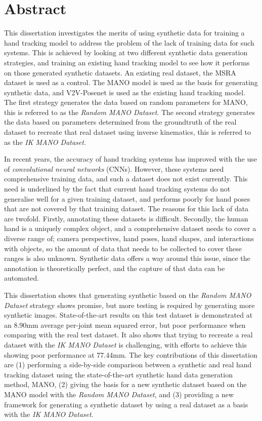 \chapter{Abstract}

This dissertation investigates the merits of using synthetic data for training a hand tracking model to address the problem of the lack of training data for such systems. This is achieved by looking at two different synthetic data generation strategies, and training an existing hand tracking model to see how it performs on those generated synthetic datasets. An existing real dataset, the MSRA dataset is used as a control. The MANO model is used as the basis for generating synthetic data, and V2V-Posenet is used as the existing hand tracking model. The first strategy generates the data based on random parameters for MANO, this is referred to as the {\slshape Random MANO Dataset}. The second strategy generates the data based on parameters determined from the groundtruth of the real dataset to recreate that real dataset using inverse kinematics, this is referred to as the {\slshape IK MANO Dataset}.

In recent years, the accuracy of hand tracking systems has improved with the use of {\slshape convolutional neural networks} (CNNs). However, these systems need comprehensive training data, and such a dataset does not exist currently. This need is underlined by the fact that current hand tracking systems do not generalise well for a given training dataset, and performs poorly for hand poses that are not covered by that training dataset. The reasons for this lack of data are twofold. Firstly, annotating these datasets is difficult. Secondly, the human hand is a uniquely complex object, and a comprehensive dataset needs to cover a diverse range of; camera perspectives, hand poses, hand shapes, and interactions with objects, so the amount of data that needs to be collected to cover these ranges is also unknown. Synthetic data offers a way around this issue, since the annotation is theoretically perfect, and the capture of that data can be automated.

This dissertation shows that generating synthetic based on the {\slshape Random MANO Dataset} strategy shows promise, but more testing is required by generating more synthetic images. State-of-the-art results on this test dataset is demonstrated at an 8.90mm average per-joint mean squared error, but poor performance when comparing with the real test dataset. It also shows that trying to recreate a real dataset with the {\slshape IK MANO Dataset} is challenging, with efforts to achieve this showing poor performance at 77.44mm. The key contributions of this dissertation are (1) performing a side-by-side comparison between a synthetic and real hand tracking dataset using the state-of-the-art synthetic hand data generation method, MANO, (2) giving the basis for a new synthetic dataset based on the MANO model with the {\slshape Random MANO Dataset}, and (3) providing a new framework for generating a synthetic dataset by using a real dataset as a basis with the {\slshape IK MANO Dataset}.
